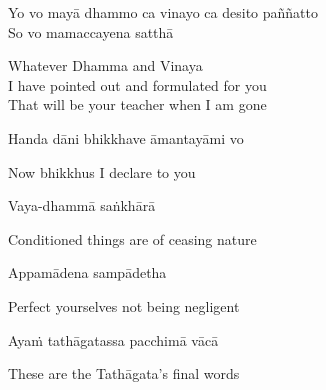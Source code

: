Yo vo mayā dhammo ca vinayo ca desito paññatto\\
So vo mamaccayena satthā

\begin{english}
  Whatever Dhamma and Vinaya\\
  I have pointed out and formulated for you\\
  That will be your teacher when I am gone
\end{english}

Handa dāni bhikkhave āmantayāmi vo

\begin{english}
  Now bhikkhus I declare to you
\end{english}

Vaya-dhammā saṅkhārā

\begin{english}
  Conditioned things are of ceasing nature
\end{english}

Appamādena sampādetha

\begin{english}
  Perfect yourselves not being negligent
\end{english}

Ayaṁ tathāgatassa pacchimā vācā

\begin{english}
  These are the Tathāgata’s final words
\end{english}

\suttaRef{[DN 16]}

